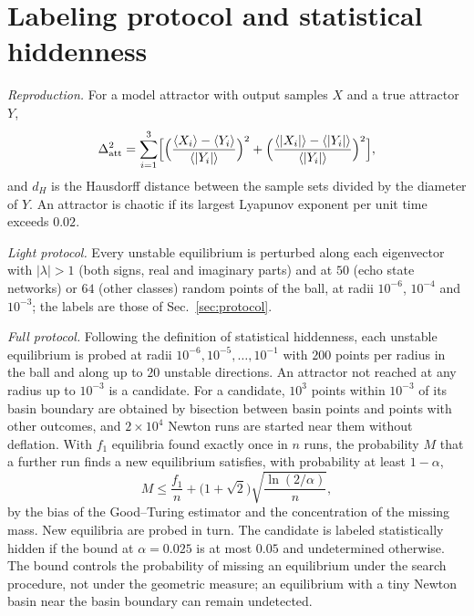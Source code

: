 \section{Labeling protocol and statistical hiddenness}
\label{app:protocol}

\emph{Reproduction.} For a model attractor with output samples $X$ and a true attractor $Y$,
\begin{equation*}
\Delta_{\mathrm{att}}^2=\sum_{i=1}^3\Bigl[\Bigl(\frac{\langle X_i\rangle-\langle Y_i\rangle}{\langle|Y_i|\rangle}\Bigr)^2
+\Bigl(\frac{\langle|X_i|\rangle-\langle|Y_i|\rangle}{\langle|Y_i|\rangle}\Bigr)^2\Bigr],
\end{equation*}
and $d_H$ is the Hausdorff distance between the sample sets divided by the diameter of $Y$. An attractor is chaotic if its
largest Lyapunov exponent per unit time exceeds $0.02$.

\emph{Light protocol.} Every unstable equilibrium is perturbed along each eigenvector with $|\lambda|>1$ (both signs, real and
imaginary parts) and at $50$ (echo state networks) or $64$ (other classes) random points of the ball, at radii $10^{-6}$,
$10^{-4}$ and $10^{-3}$; the labels are those of Sec.~\ref{sec:protocol}.

\emph{Full protocol.} Following the definition of statistical
hiddenness,\cite{Good1953,McAllesterOrtiz2003,BerendKontorovich2013,BenHamou2017MissingMass} each unstable equilibrium is
probed at radii $10^{-6},10^{-5},\dots,10^{-1}$ with $200$ points per radius in the ball and along up to $20$ unstable
directions. An attractor not reached at any radius up to $10^{-3}$ is a candidate. For a candidate, $10^3$ points within
$10^{-3}$ of its basin boundary are obtained by bisection between basin points and points with other outcomes, and
$2\times10^4$ Newton runs are started near them without deflation. With $f_1$ equilibria found exactly once in $n$ runs, the
probability $M$ that a further run finds a new equilibrium satisfies, with probability at least $1-\alpha$,
\begin{equation*}
M\le\frac{f_1}{n}+\bigl(1+\sqrt2\bigr)\sqrt{\frac{\ln(2/\alpha)}{n}},
\end{equation*}
by the bias of the Good--Turing estimator and the concentration of the missing mass. New equilibria are probed in turn. The
candidate is labeled statistically hidden if the bound at $\alpha=0.025$ is at most $0.05$ and undetermined otherwise. The
bound controls the probability of missing an equilibrium under the search procedure, not under the geometric measure; an
equilibrium with a tiny Newton basin near the basin boundary can remain undetected.

